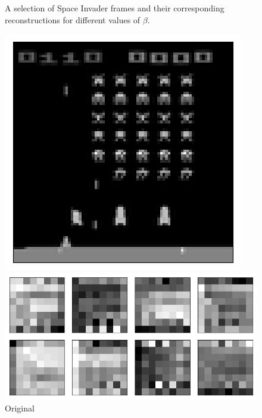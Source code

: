 \begin{figure}[h!]
\begin{multicols}{4}
    \caption{$\beta = 4$}
\end{multicols}
\caption{A selection of Space Invader frames and their corresponding reconstructions for different values of $\beta$.}
\label{fig:weighted_average_originals_and_reconstructions}
\end{figure}




\begin{figure}[h!]
\centering
\captionsetup{justification=centering}
\begin{minipage}{0.4\textwidth}
\centering
\captionsetup{justification=centering}
\includegraphics[scale=0.4]{figures/results/weighted_average/beta_1_sample_3_original.png}
\caption{Original}
\end{minipage}
\begin{minipage}{0.55\textwidth}
\centering
\captionsetup{justification=centering}
\includegraphics[scale=0.42]{figures/results/weighted_average/beta_1_convolutional_layers_sample_3.png}

\end{minipage}
\end{figure}
